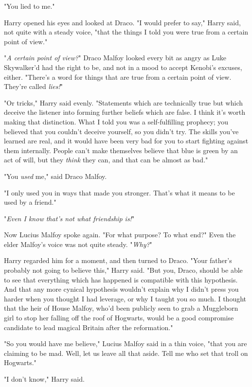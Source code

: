 "You lied to me."

Harry opened his eyes and looked at Draco. "I would prefer to say," Harry said, 
not quite with a steady voice, "that the things I told you were true from a 
certain point of view."

"\emph{A certain point of view?}" Draco Malfoy looked every bit as angry as 
Luke Skywalker'd had the right to be, and not in a mood to accept Kenobi's 
excuses, either. "There's a word for things that are true from a certain point 
of view. They're called \emph{lies!}"

"Or tricks," Harry said evenly. "Statements which are technically true but 
which deceive the listener into forming further beliefs which are false. I 
think it's worth making that distinction. What I told you was a self-fulfilling 
prophecy; you believed that you couldn't deceive yourself, so you didn't try. 
The skills you've learned are real, and it would have been very bad for you to 
start fighting against them internally. People can't make themselves believe 
that blue is green by an act of will, but they \emph{think} they can, and that 
can be almost as bad."

"You \emph{used} me," said Draco Malfoy.

"I only used you in ways that made you stronger. That's what it means to be 
used by a friend."

"\emph{Even I know that's not what friendship is!}"

Now Lucius Malfoy spoke again. "For what purpose? To what end?" Even the elder 
Malfoy's voice was not quite steady. "\emph{Why?}"

Harry regarded him for a moment, and then turned to Draco. "Your father's 
probably not going to believe this," Harry said. "But you, Draco, should be 
able to see that everything which has happened is compatible with this 
hypothesis. And that any more cynical hypothesis wouldn't explain why I didn't 
press you harder when you thought I had leverage, or why I taught you so much. 
I thought that the heir of House Malfoy, who'd been publicly seen to grab a 
Muggleborn girl to stop her falling off the roof of Hogwarts, would be a good 
compromise candidate to lead magical Britain after the reformation."

"So you would have me believe," Lucius Malfoy said in a thin voice, "that you 
are claiming to be mad. Well, let us leave all that aside. Tell me who set that 
troll on Hogwarts."

"I don't know," Harry said.


